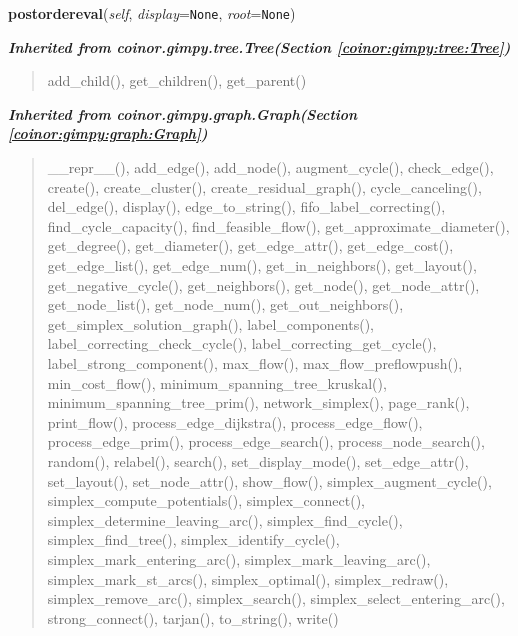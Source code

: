     \vspace{0.5ex}

\hspace{.8\funcindent}\begin{boxedminipage}{\funcwidth}

    \raggedright \textbf{postordereval}(\textit{self}, \textit{display}={\tt None}, \textit{root}={\tt None})

\setlength{\parskip}{2ex}
\setlength{\parskip}{1ex}
    \end{boxedminipage}


\large{\textbf{\textit{Inherited from coinor.gimpy.tree.Tree\textit{(Section \ref{coinor:gimpy:tree:Tree})}}}}

\begin{quote}
add\_child(), get\_children(), get\_parent()
\end{quote}

\large{\textbf{\textit{Inherited from coinor.gimpy.graph.Graph\textit{(Section \ref{coinor:gimpy:graph:Graph})}}}}

\begin{quote}
\_\_repr\_\_(), add\_edge(), add\_node(), augment\_cycle(), check\_edge(), create(), create\_cluster(), create\_residual\_graph(), cycle\_canceling(), del\_edge(), display(), edge\_to\_string(), fifo\_label\_correcting(), find\_cycle\_capacity(), find\_feasible\_flow(), get\_approximate\_diameter(), get\_degree(), get\_diameter(), get\_edge\_attr(), get\_edge\_cost(), get\_edge\_list(), get\_edge\_num(), get\_in\_neighbors(), get\_layout(), get\_negative\_cycle(), get\_neighbors(), get\_node(), get\_node\_attr(), get\_node\_list(), get\_node\_num(), get\_out\_neighbors(), get\_simplex\_solution\_graph(), label\_components(), label\_correcting\_check\_cycle(), label\_correcting\_get\_cycle(), label\_strong\_component(), max\_flow(), max\_flow\_preflowpush(), min\_cost\_flow(), minimum\_spanning\_tree\_kruskal(), minimum\_spanning\_tree\_prim(), network\_simplex(), page\_rank(), print\_flow(), process\_edge\_dijkstra(), process\_edge\_flow(), process\_edge\_prim(), process\_edge\_search(), process\_node\_search(), random(), relabel(), search(), set\_display\_mode(), set\_edge\_attr(), set\_layout(), set\_node\_attr(), show\_flow(), simplex\_augment\_cycle(), simplex\_compute\_potentials(), simplex\_connect(), simplex\_determine\_leaving\_arc(), simplex\_find\_cycle(), simplex\_find\_tree(), simplex\_identify\_cycle(), simplex\_mark\_entering\_arc(), simplex\_mark\_leaving\_arc(), simplex\_mark\_st\_arcs(), simplex\_optimal(), simplex\_redraw(), simplex\_remove\_arc(), simplex\_search(), simplex\_select\_entering\_arc(), strong\_connect(), tarjan(), to\_string(), write()
\end{quote}

